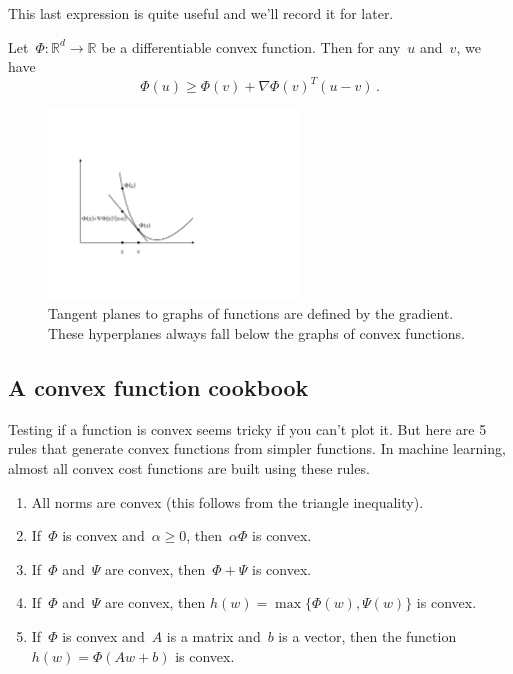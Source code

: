 \documentclass{tufte-book}
\begin{document}
This last expression is quite useful and we'll record it for later.

\begin{Proposition}

Let~\(\Phi:\mathbb{R}^d\rightarrow \mathbb{R}\) be a differentiable
convex function. Then for any~\(u\) and~\(v\), we have \[
        \Phi(u) \geq \Phi(v) + \nabla \Phi(v)^T(u-v)\,.
\]

\end{Proposition}

\begin{figure}
\centering
\includegraphics[width=0.6\textwidth,height=\textheight]{assets/line_below}
\caption{Tangent planes to graphs of functions are defined by the
gradient. These hyperplanes always fall below the graphs of convex
functions.}
\end{figure}

\hypertarget{a-convex-function-cookbook}{%
\subsection{A convex function
cookbook}\label{a-convex-function-cookbook}}

Testing if a function is convex seems tricky if you can't plot it. But
here are 5 rules that generate convex functions from simpler functions.
In machine learning, almost all convex cost functions are built using
these rules.

\begin{enumerate}
\def\labelenumi{\arabic{enumi}.}
\item
  All norms are convex (this follows from the triangle inequality).
\item
  If~\(\Phi\) is convex and~\(\alpha \geq 0\), then~\(\alpha \Phi\) is
  convex.
\item
  If~\(\Phi\) and~\(\Psi\) are convex, then~\(\Phi+\Psi\) is convex.
\item
  If~\(\Phi\) and~\(\Psi\) are convex, then
  \(h(w) = \max \{\Phi(w),\Psi(w)\}\) is convex.
\item
  If~\(\Phi\) is convex and~\(A\) is a matrix and~\(b\) is a vector,
  then the function~\(h(w)=\Phi(Aw+b)\) is convex.
\end{enumerate}
\end{document}
